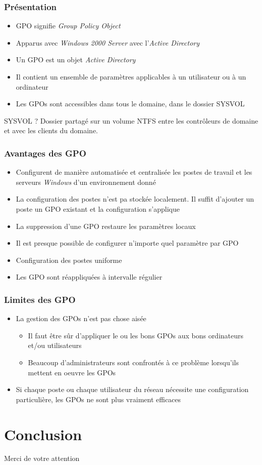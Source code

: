 \documentclass{beamer}
\begin{document}
  \begin{frame}
   \frametitle{Présentation}
   \begin{itemize}
    \item GPO signifie \textit{Group Policy Object}
    \item Apparus avec \textit{Windows 2000 Server} avec l'\textit{Active Directory}
    \item Un GPO est un objet \textit{Active Directory}
    \item Il contient un ensemble de paramètres applicables à un utilisateur ou à un ordinateur
    \item Les GPOs sont accessibles dans tous le domaine, dans le dossier SYSVOL
   \end{itemize}
   \begin{block}{SYSVOL ?}
    Dossier partagé sur un volume NTFS entre les contrôleurs de domaine et avec les clients du domaine.
   \end{block}
  \end{frame}

  \begin{frame}
   \frametitle{Avantages des GPO}
   \begin{itemize}
    \item Configurent de manière automatisée et centralisée les postes de travail et les serveurs \textit{Windows} d'un environnement donné
    \item La configuration des postes n'est pa stockée localement. Il suffit d'ajouter un poste un GPO existant et la configuration s'applique
    \item La suppression d'une GPO restaure les paramètres locaux
    \item Il est presque possible de configurer n'importe quel paramètre par GPO
    \item Configuration des postes uniforme
    \item Les GPO sont réappliquées à intervalle régulier
   \end{itemize}
  \end{frame}
  
  \begin{frame}
   \frametitle{Limites des GPO}
   \begin{itemize}
    \item La gestion des GPOs n'est pas chose aisée
    \begin{itemize}
      \item Il faut être sûr d'appliquer le ou les bons GPOs aux bons ordinateurs et/ou utilisateurs
      \item Beaucoup d'administrateurs sont confrontés à ce problème lorsqu'ils mettent en oeuvre les GPOs
    \end{itemize}
    \item Si chaque poste ou chaque utilisateur du réseau nécessite une configuration particulière, les GPOs ne sont plus vraiment efficaces
   \end{itemize}
  \end{frame}


  \section{Conclusion}
  
  \begin{frame}
    \begin{center}
      Merci de votre attention
    \end{center}
  \end{frame}
\end{document}
